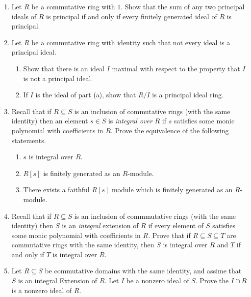 \documentclass{article}
\theoremstyle{definition}
\begin{document}
\begin{enumerate}
            \item Let $R$ be a commutative ring with $1$. Show that the sum of any two principal ideals of $R$ is principal if and only if every finitely generated ideal of $R$ is principal.
            
            \item Let $R$ be a commutative ring with identity such that not every ideal is a principal ideal.
            
            \begin{enumerate}
                \item Show that there is an ideal $I$ maximal with respect to the property that $I$ is not a principal ideal.
                \item If $I$ is the ideal of part (a), show that $R/I$ is a principal ideal ring.
            \end{enumerate}

            \item Recall that if $R\subseteq S$ is an inclusion of commutative rings (with the same identity) then an element $s\in S$ is \textit{integral over} $R$ if $s$ satisfies some monic polynomial with coefficients in $R$. Prove the equivalence of the following statements.
            
            \begin{enumerate}
                \item $s$ is integral over $R$.
                \item $R[s]$ is finitely generated as an $R$-module.
                \item There exists a faithful $R[s]$ module which is finitely generated as an $R$-module.
            \end{enumerate}

            \item Recall that if $R\subseteq S$ is an inclusion of commmutative rings (with the same identity) then $S$ is an \textit{integral} extension of $R$ if every element of $S$ satisfies some monic polynomial with coefficients in $R$. Prove that if $R\subseteq S\subseteq T$ are commutative rings with the same identity, then $S$ is integral over $R$ and $T$ if and only if $T$ is integral over $R$.
            
            \item Let $R\subseteq S$ be commutative domains with the same identity, and assime that $S$ is an integral Extension of $R$. Let $I$ be a nonzero ideal of $S$. Prove the $I\cap R$ is a nonzero ideal of $R$.


\end{enumerate}
\end{document}
